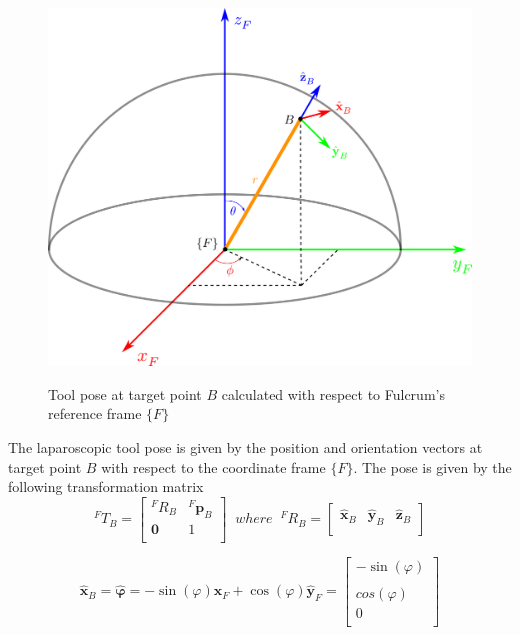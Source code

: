 \begin{center}
\begin{figure}[!htb]
\centering
\includegraphics[width=12cm]{images/fulcrum-space.png}\\
\caption{Tool pose at target point $B$ calculated with respect to Fulcrum's reference frame $\lbrace F \rbrace$}
\end{figure}
\end{center}

The laparoscopic tool pose is given by the position and orientation vectors at target point $B$ with respect to the coordinate frame $\lbrace F \rbrace$.
The pose is given by the following transformation matrix
\[
{}^{F}T_B = \begin{bmatrix}
{}^{F}R_B & {}^{F}\mathbf{p}^{}_B \\
\mathbf{0} & 1 \\
\end{bmatrix}
\;\; where \;\;
{}^{F}R_B = \begin{bmatrix}
\hat{\mathbf{x}}^{}_B & \hat{\mathbf{y}}^{}_B & \hat{\mathbf{z}}^{}_B \\
\end{bmatrix}
\]

\begin{equation}
\hat{\mathbf{x}}^{}_B = \hat{\mathbf{φ}} = -\sin(φ)\hat{\mathbf{x}}^{}_F + \cos(φ)\hat{\mathbf{y}}^{}_F
= \begin{bmatrix}
-\sin(φ) \\
\\cos(φ) \\
0 \\
\end{bmatrix}
\end{equation}

